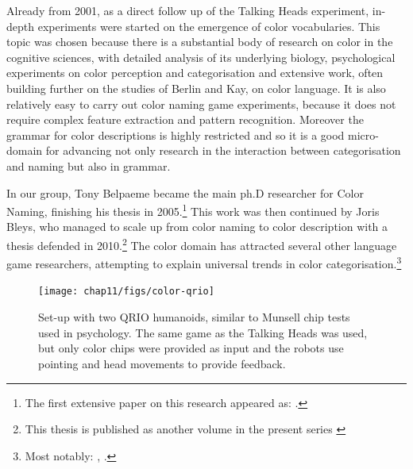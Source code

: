 Already from 2001, as a direct follow up of the Talking Heads experiment, in-depth experiments were started on the emergence of 
color vocabularies. This topic was chosen because 
there is a substantial body of research on color in the cognitive sciences, with 
detailed analysis of its underlying biology, psychological experiments on color perception and categorisation 
and extensive work, often building further on the studies of Berlin and Kay, on color language. It is also 
relatively easy to carry out color naming game experiments, because it does not require complex feature extraction 
and pattern recognition. Moreover the grammar for color descriptions is highly restricted and so it is a good micro-domain for 
advancing not only research in the interaction between categorisation and naming but also in grammar. 

In our group, Tony Belpaeme became the main ph.D researcher for Color Naming, finishing his thesis 
in 2005.\footnote{The first extensive paper on this research appeared as: \cite{Steels:2005}.}
This work was then continued by Joris Bleys, who managed to scale up from color naming to color description with 
a thesis defended in 2010.\footnote{This thesis is published as another volume in the present series \cite{Bleys:2014}}
The color domain has attracted several other language game researchers, attempting to explain 
universal trends in color categorisation.\footnote{Most notably: \cite{Puglisi:2008}, \cite{Baronchelli:2010}.}

\begin{figure}[htbp]
  \centerline{\texttt{[image: chap11/figs/color-qrio]}}
\caption{\footnotesize\label{fig:munsell} 
Set-up with two QRIO humanoids, similar to Munsell chip tests used in psychology. The same game as the Talking 
Heads was used, but only color chips were provided as input and the robots use pointing and head movements to 
provide feedback.}
\end{figure}

